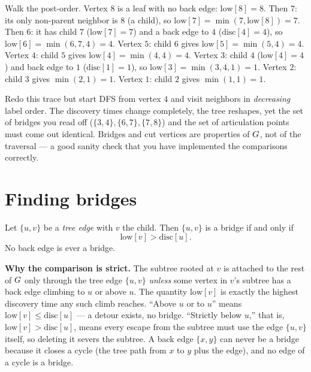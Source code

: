 Walk the post-order. Vertex $8$ is a leaf with no back edge: $\mathrm{low}[8]=8$. Then
$7$: its only non-parent neighbor is $8$ (a child), so $\mathrm{low}[7]=\min(7,
\mathrm{low}[8])=7$. Then $6$: it has child $7$ ($\mathrm{low}[7]=7$) and a back edge to
$4$ ($\mathrm{disc}[4]=4$), so $\mathrm{low}[6]=\min(6,7,4)=4$. Vertex $5$: child $6$ gives
$\mathrm{low}[5]=\min(5,4)=4$. Vertex $4$: child $5$ gives $\mathrm{low}[4]=\min(4,4)=4$.
Vertex $3$: child $4$ ($\mathrm{low}[4]=4$) and back edge to $1$ ($\mathrm{disc}[1]=1$),
so $\mathrm{low}[3]=\min(3,4,1)=1$. Vertex $2$: child $3$ gives $\min(2,1)=1$. Vertex
$1$: child $2$ gives $\min(1,1)=1$.

\begin{labbox}
Redo this trace but start DFS from vertex $4$ and visit neighbors in \emph{decreasing}
label order. The discovery times change completely, the tree reshapes, yet the set of
bridges you read off ($\{3,4\},\{6,7\},\{7,8\}$) and the set of articulation points
must come out identical. Bridges and cut vertices are properties of $G$, not of the
traversal --- a good sanity check that you have implemented the comparisons correctly.
\end{labbox}

\section{Finding bridges}
\label{ch10:bridges}

\begin{theorem}
\label{ch10:thm-bridge}
Let $\{u,v\}$ be a \emph{tree edge} with $v$ the child. Then $\{u,v\}$ is a bridge if
and only if
\[
  \mathrm{low}[v] > \mathrm{disc}[u].
\]
No back edge is ever a bridge.
\end{theorem}

\begin{whybox}
\textbf{Why the comparison is strict.} The subtree rooted at $v$ is attached to the
rest of $G$ only through the tree edge $\{u,v\}$ \emph{unless} some vertex in $v$'s
subtree has a back edge climbing to $u$ or above $u$. The quantity $\mathrm{low}[v]$ is
exactly the highest discovery time any such climb reaches. ``Above $u$ or to $u$''
means $\mathrm{low}[v]\le\mathrm{disc}[u]$ --- a detour exists, no bridge. ``Strictly
below $u$,'' that is, $\mathrm{low}[v]>\mathrm{disc}[u]$, means every escape from the
subtree must use the edge $\{u,v\}$ itself, so deleting it severs the subtree. A back
edge $\{x,y\}$ can never be a bridge because it closes a cycle (the tree path from $x$
to $y$ plus the edge), and no edge of a cycle is a bridge.
\end{whybox}

